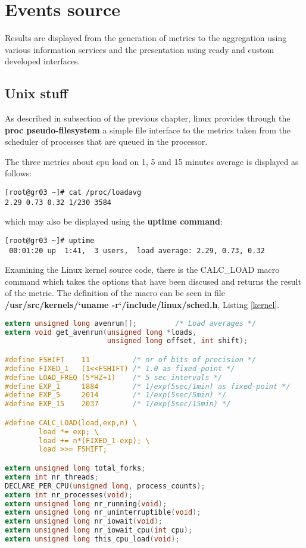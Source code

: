\section{Events source}

Results are displayed from the generation of metrics to the aggregation using various information services and the presentation using ready and custom developed interfaces.

\subsection{Unix stuff}

As described in subsection  of the previous chapter, linux provides through the {\bf proc pseudo-filesystem} a simple file interface to the metrics taken from the scheduler of processes that are queued in the processor.

The three metrics about cpu load on 1, 5 and 15 minutes average is displayed as follows:

\begin{verbatim}
[root@gr03 ~]# cat /proc/loadavg 
2.29 0.73 0.32 1/230 3584
\end{verbatim}

which may also be displayed using the {\bf uptime command}:

\begin{verbatim}
[root@gr03 ~]# uptime
 00:01:20 up  1:41,  3 users,  load average: 2.29, 0.73, 0.32
\end{verbatim}

Examining the Linux kernel source code, there is the CALC\_LOAD macro command which takes the options that have been discused and returns the result of the metric. The definition of the macro can be seen in file {\bf /usr/src/kernels/`uname -r`/include/linux/sched.h}, Listing \ref{kernel}.

\begin{lstlisting}[language=C,caption=Linux kernel CALC\_LOAD macro,label=kernel]
extern unsigned long avenrun[];         /* Load averages */
extern void get_avenrun(unsigned long *loads, 
                        unsigned long offset, int shift);

#define FSHIFT    11          /* nr of bits of precision */
#define FIXED_1   (1<<FSHIFT) /* 1.0 as fixed-point */
#define LOAD_FREQ (5*HZ+1)    /* 5 sec intervals */
#define EXP_1     1884        /* 1/exp(5sec/1min) as fixed-point */
#define EXP_5     2014        /* 1/exp(5sec/5min) */
#define EXP_15    2037        /* 1/exp(5sec/15min) */

#define CALC_LOAD(load,exp,n) \
        load *= exp; \
        load += n*(FIXED_1-exp); \
        load >>= FSHIFT;

extern unsigned long total_forks;
extern int nr_threads;
DECLARE_PER_CPU(unsigned long, process_counts);
extern int nr_processes(void);
extern unsigned long nr_running(void);
extern unsigned long nr_uninterruptible(void);
extern unsigned long nr_iowait(void);
extern unsigned long nr_iowait_cpu(int cpu);
extern unsigned long this_cpu_load(void);
\end{lstlisting}

